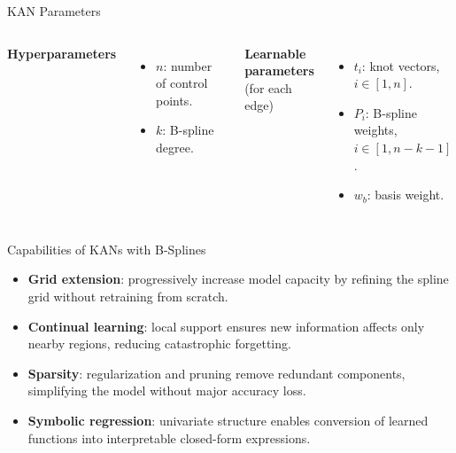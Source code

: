 \documentclass[aspectratio=169]{beamer}
\begin{document}

\begin{frame}{KAN Parameters}
	
	\begin{columns}[T,onlytextwidth]
		
		\centering
		\resizebox{!}{0.8\textheight}{}
		
		
		\textbf{Hyperparameters}
		\begin{itemize}
			\item $n$: number of control points.
			\item $k$: B-spline degree.
		\end{itemize}
		
		\vspace{0.8em}
		\textbf{Learnable parameters}\\(for each edge)
		\begin{itemize}
			\item $t_i$: knot vectors, $i \in [1, n]$.
			\item $P_i$: B-spline weights, $i \in [1, n-k-1]$.
			\item $w_b$: basis weight.
		\end{itemize}
		
	\end{columns}
	
\end{frame}


\begin{frame}{Capabilities of KANs with B-Splines}
	
	\begin{itemize}
		\item \textbf{Grid extension}: progressively increase model capacity by refining the spline grid without retraining from scratch.
		\item \textbf{Continual learning}: local support ensures new information affects only nearby regions, reducing catastrophic forgetting.
		\item \textbf{Sparsity}: regularization and pruning remove redundant components, simplifying the model without major accuracy loss.
		\item \textbf{Symbolic regression}: univariate structure enables conversion of learned functions into interpretable closed-form expressions.
	\end{itemize}
	
\end{frame}
\end{document}
